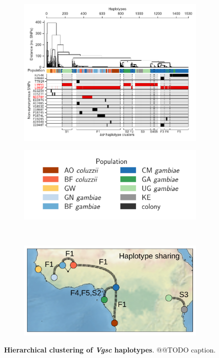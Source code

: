 \documentclass[a4paper,11pt,abstracton,hidelinks]{scrartcl}
\newcommand{\vgsc}{\textit{Vgsc}\xspace}
\begin{document}
%
\begin{figure}[!t]

  \centering

  \begin{subfigure}{\textwidth}
  \centering
  \includegraphics[width=\textwidth]{artwork/vgsc_haplotypes.pdf}
  \end{subfigure}%

  \begin{subfigure}{0.5\textwidth}
  \centering
  \includegraphics[width=\textwidth]{artwork/pop_legend.png}
  \end{subfigure}%
  ~
  \begin{subfigure}{0.5\textwidth}
  \centering
  \includegraphics[width=\textwidth]{artwork/minimap_vgsc.pdf}
  \end{subfigure}%

  \caption{\textbf{Hierarchical clustering of \vgsc haplotypes}. @@TODO caption.}

  \label{fig:vgsc_haplotypes}

\end{figure}
\end{document}
